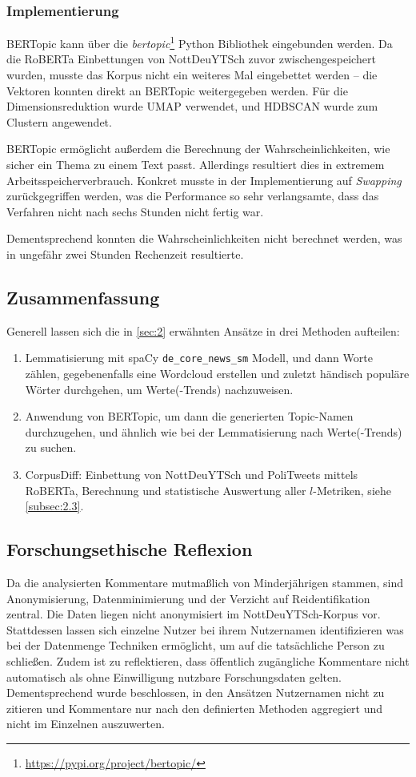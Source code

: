 \subsubsection{Implementierung}
BERTopic kann über die \emph{bertopic}\footnote{\url{https://pypi.org/project/bertopic/}} Python Bibliothek eingebunden werden.
Da die RoBERTa Einbettungen von NottDeuYTSch zuvor zwischengespeichert wurden, musste das Korpus nicht ein weiteres Mal eingebettet werden -- die Vektoren konnten direkt an BERTopic weitergegeben werden.
Für die Dimensionsreduktion wurde UMAP verwendet, und HDBSCAN wurde zum Clustern angewendet.

BERTopic ermöglicht außerdem die Berechnung der Wahrscheinlichkeiten, wie sicher ein Thema zu einem Text passt.
Allerdings resultiert dies in extremem Arbeitsspeicherverbrauch.
Konkret musste in der Implementierung auf \emph{Swapping} zurückgegriffen werden, was die Performance so sehr verlangsamte, dass das Verfahren nicht nach sechs Stunden nicht fertig war.

Dementsprechend konnten die Wahrscheinlichkeiten nicht berechnet werden, was in ungefähr zwei Stunden Rechenzeit resultierte.

\subsection{Zusammenfassung}
Generell lassen sich die in \autoref{sec:2} erwähnten Ansätze in drei Methoden aufteilen:
\begin{enumerate}
    \item Lemmatisierung mit spaCy \lstinline|de_core_news_sm| Modell, und dann Worte zählen, gegebenenfalls eine Wordcloud erstellen und zuletzt händisch populäre Wörter durchgehen, um Werte(-Trends) nachzuweisen.

    \item Anwendung von BERTopic, um dann die generierten Topic-Namen durchzugehen, und ähnlich wie bei der Lemmatisierung nach Werte(-Trends) zu suchen.

    \item CorpusDiff: Einbettung von NottDeuYTSch und PoliTweets mittels RoBERTa, Berechnung und statistische Auswertung aller \(l\)-Metriken, siehe \autoref{subsec:2.3}.
\end{enumerate}

\subsection{Forschungsethische Reflexion}
Da die analysierten Kommentare mutmaßlich von Minderjährigen stammen, sind Anonymisierung, Datenminimierung und der Verzicht auf Reidentifikation zentral.
Die Daten liegen nicht anonymisiert im NottDeuYTSch-Korpus vor.
Stattdessen lassen sich einzelne Nutzer bei ihrem Nutzernamen identifizieren was bei der Datenmenge Techniken ermöglicht, um auf die tatsächliche Person zu schließen.
Zudem ist zu reflektieren, dass öffentlich zugängliche Kommentare nicht automatisch als ohne Einwilligung nutzbare Forschungsdaten gelten.
Dementsprechend wurde beschlossen, in den Ansätzen Nutzernamen nicht zu zitieren und Kommentare nur nach den definierten Methoden aggregiert und nicht im Einzelnen auszuwerten.

